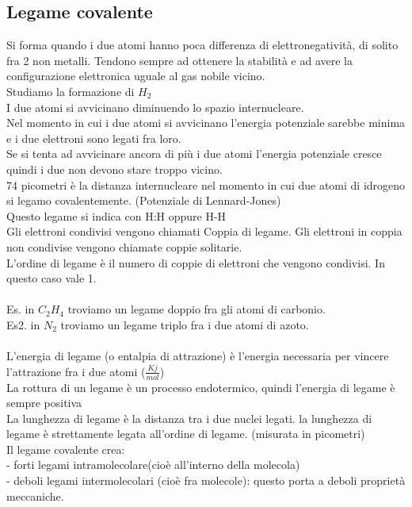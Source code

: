 \subsection{Legame covalente}
Si forma quando i due atomi hanno poca differenza di elettronegatività, di solito fra 2 non metalli. Tendono sempre ad ottenere la stabilità e ad avere la configurazione elettronica uguale al gas nobile vicino.\\
Studiamo la formazione di $H_2$\\
I due atomi si avvicinano diminuendo lo spazio internucleare. \\
Nel momento in cui i due atomi si avvicinano l’energia potenziale sarebbe minima e i due elettroni sono legati fra loro.\\
Se si tenta ad avvicinare ancora di più i due atomi l’energia potenziale cresce quindi i due non devono stare troppo vicino.\\
74 picometri è la distanza internucleare nel momento in cui due atomi di idrogeno si legamo covalentemente. (Potenziale di Lennard-Jones)\\
Questo legame si indica con H:H oppure H-H\\
Gli elettroni condivisi vengono chiamati Coppia di legame. Gli elettroni in coppia non condivise vengono chiamate coppie solitarie.\\
L’ordine di legame è il numero di coppie di elettroni che vengono condivisi. In questo caso vale 1. \\\\
Es. in $C_2H_4$ troviamo un legame doppio fra gli atomi di carbonio.\\
Es2. in $N_2$ troviamo un legame triplo fra i due atomi di azoto.\\\\
L’energia di legame (o entalpia di attrazione) è l’energia necessaria per vincere l’attrazione fra i due atomi ($\frac{Kj}{mol}$)\\
La rottura di un legame è un processo endotermico, quindi l’energia di legame è sempre positiva\\
La lunghezza di legame è la distanza tra i due nuclei legati. la lunghezza di legame è strettamente legata all’ordine di legame. (misurata in picometri)\\
Il legame covalente crea:\\
\tab- forti legami intramolecolare(cioè all’interno della molecola)\\
\tab- deboli legami intermolecolari (cioè fra molecole): questo porta a deboli proprietà meccaniche.
